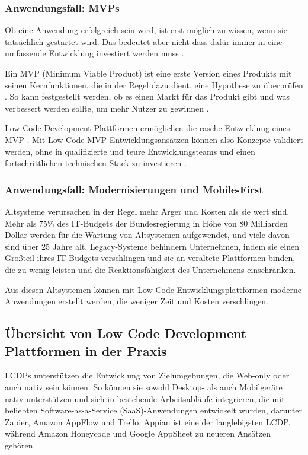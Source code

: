 \documentclass[12pt]{article} %
\begin{document}
	\subsubsection{Anwendungsfall: MVPs} \label{MVP}
	Ob eine Anwendung erfolgreich sein wird, ist erst möglich zu wissen, wenn sie tatsächlich gestartet wird. Das bedeutet aber nicht dass dafür immer in eine umfassende Entwicklung investiert werden muss \autocite{OleksiiGlib.2022}. \newline
	
	Ein MVP (Minimum Viable Product) ist eine erste Version eines Produkts mit seinen Kernfunktionen, die in der Regel dazu dient, eine Hypothese zu überprüfen \autocite{OleksiiGlib.2022}. So kann festgestellt werden, ob es einen Markt für das Produkt gibt und was verbessert werden sollte, um mehr Nutzer zu gewinnen \autocite{OleksiiGlib.2022}.
	
	Low Code Development Plattformen ermöglichen die rasche Entwicklung eines MVP \autocite{OleksiiGlib.2022}. Mit Low Code MVP Entwicklungsansätzen können also Konzepte validiert werden, ohne in qualifizierte und teure Entwicklungsteams und einen fortschrittlichen technischen Stack zu investieren \autocite{OleksiiGlib.2022}.
	
	\subsubsection{Anwendungsfall: Modernisierungen und Mobile-First}	
	Altsysteme verursachen in der Regel mehr Ärger und Kosten als sie wert sind. Mehr als 75\% des IT-Budgets der Bundesregierung in Höhe von 80 Milliarden Dollar werden für die Wartung von Altsystemen aufgewendet, und viele davon sind über 25 Jahre alt. Legacy-Systeme behindern Unternehmen, indem sie einen Großteil ihres IT-Budgets verschlingen und sie an veraltete Plattformen binden, die zu wenig leisten und die Reaktionsfähigkeit des Unternehmens einschränken. \autocite{KevinShuler.2023}
	
	Aus diesen Altsystemen können mit Low Code Entwicklungsplattformen moderne Anwendungen erstellt werden, die weniger Zeit und Kosten verschlingen. 	
	
	\subsection{Übersicht von Low Code Development Plattformen in der Praxis}	
	LCDPs unterstützen die Entwicklung von Zielumgebungen, die Web-only oder auch nativ sein können. So können sie sowohl Desktop- als auch Mobilgeräte nativ unterstützen und sich in bestehende Arbeitsabläufe integrieren, die mit beliebten Software-as-a-Service (SaaS)-Anwendungen entwickelt wurden, darunter Zapier, Amazon AppFlow und Trello. Appian ist eine der langlebigsten LCDP, während Amazon Honeycode und Google AppSheet zu neueren Ansätzen gehören. \autocite{DiRuscio.2022} \newline
	
\end{document}
